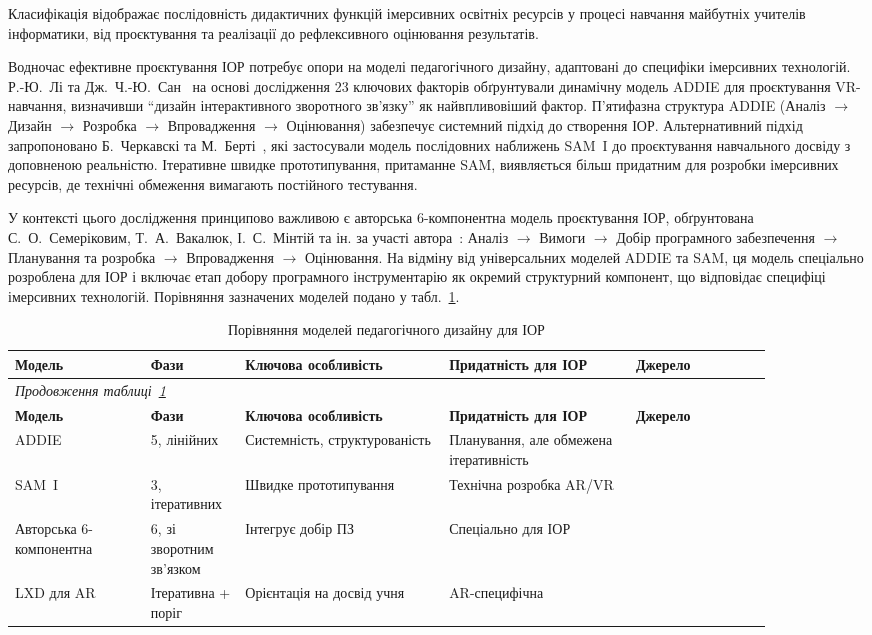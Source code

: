 Класифікація відображає послідовність дидактичних функцій імерсивних освітніх ресурсів у процесі навчання майбутніх учителів інформатики, від проєктування та реалізації до рефлексивного оцінювання результатів.

Водночас ефективне проєктування ІОР потребує опори на моделі педагогічного дизайну, адаптовані до специфіки імерсивних технологій. Р.-Ю.~Лі та Дж.~Ч.-Ю.~Сан~\cite{Li2024ADDIE} на основі дослідження 23 ключових факторів обґрунтували динамічну модель ADDIE для проєктування VR-навчання, визначивши ``дизайн інтерактивного зворотного зв'язку'' як найвпливовіший фактор. П'ятифазна структура ADDIE (Аналіз $\to$ Дизайн $\to$ Розробка $\to$ Впровадження $\to$ Оцінювання) забезпечує системний підхід до створення ІОР. Альтернативний підхід запропоновано Б.~Черкавскі та М.~Берті~\cite{Czerkawski2021LXD}, які застосували модель послідовних наближень SAM~I до проєктування навчального досвіду з доповненою реальністю. Ітеративне швидке прототипування, притаманне SAM, виявляється більш придатним для розробки імерсивних ресурсів, де технічні обмеження вимагають постійного тестування.

У контексті цього дослідження принципово важливою є авторська 6-компонентна модель проєктування ІОР, обґрунтована С.~О.~Семеріковим, Т.~А.~Вакалюк, І.~С.~Мінтій та ін. за участі автора~\cite{Semerikov2022IERDesign}: Аналіз $\to$ Вимоги $\to$ Добір програмного забезпечення $\to$ Планування та розробка $\to$ Впровадження $\to$ Оцінювання. На відміну від універсальних моделей ADDIE та SAM, ця модель спеціально розроблена для ІОР і включає етап добору програмного інструментарію як окремий структурний компонент, що відповідає специфіці імерсивних технологій. Порівняння зазначених моделей подано у табл.~\ref{tab:design_models}.

{%
\begin{longtable}{|p{0.16\linewidth}|p{0.10\linewidth}|p{0.24\linewidth}|p{0.22\linewidth}|p{0.16\linewidth}|}
\caption{Порівняння моделей педагогічного дизайну для ІОР}\label{tab:design_models}\\
\hline
\textbf{Модель} & \textbf{Фази} & \textbf{Ключова особливість} & \textbf{Придатність для ІОР} & \textbf{Джерело} \\
\hline
\endfirsthead
\multicolumn{5}{l}{\textit{Продовження таблиці~\ref{tab:design_models}}}\\
\hline
\textbf{Модель} & \textbf{Фази} & \textbf{Ключова особливість} & \textbf{Придатність для ІОР} & \textbf{Джерело} \\
\hline
\endhead
\hline
\endfoot
ADDIE & 5, лінійних & Системність, структурованість & Планування, але обмежена ітеративність & \cite{Li2024ADDIE} \\
\hline
SAM~I & 3, ітеративних & Швидке прототипування & Технічна розробка AR/VR & \cite{Czerkawski2021LXD} \\
\hline
Авторська 6-компо\-нентна & 6, зі зворотним зв'язком & Інтегрує добір ПЗ & Спеціально для ІОР & \cite{Semerikov2022IERDesign} \\
\hline
LXD для AR & Ітеративна + поріг & Орієнтація на досвід учня & AR-специфічна & \cite{Czerkawski2021LXD} \\
\hline
\end{longtable}
}

